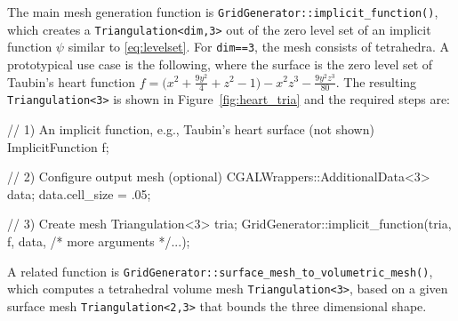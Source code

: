 \documentclass{ansarticle-preprint}
\begin{document}
The main mesh generation function is
\texttt{GridGenerator::implicit\_function()}, which creates a \texttt{Triangulation<dim,3>} out of the zero level set of an implicit function $\psi$ similar to \eqref{eq:levelset}.
For \texttt{dim==3}, the mesh consists of tetrahedra. A prototypical use case is the following, where the surface is the zero level set of Taubin's heart function $f=\bigl ( x^2 + \frac{9y^2}{4} +z^2 -1 \bigr ) -x^2 z^3 - \frac{9y^2z^3}{80}$. The resulting \texttt{Triangulation<3>} is shown in Figure~\ref{fig:heart_tria}
and the required steps are:
\begin{c++}
// 1) An implicit function, e.g., Taubin's heart surface (not shown)
ImplicitFunction f;

// 2) Configure output mesh (optional)
CGALWrappers::AdditionalData<3> data; data.cell_size = .05;

// 3) Create mesh
Triangulation<3> tria;
GridGenerator::implicit_function(tria, f, data, /* more arguments */...);
\end{c++}

A related function is
\texttt{GridGenerator::surface\_mesh\_to\_volumetric\_mesh()}, which
computes a tetrahedral volume mesh \texttt{Triangulation<3>}, based on a
given surface mesh \texttt{Triangulation<2,3>} that bounds
the three dimensional shape.
\end{document}
